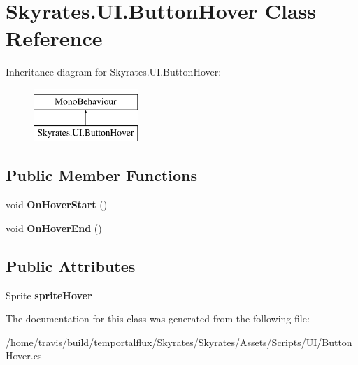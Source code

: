 \hypertarget{class_skyrates_1_1_u_i_1_1_button_hover}{\section{Skyrates.\-U\-I.\-Button\-Hover Class Reference}
\label{class_skyrates_1_1_u_i_1_1_button_hover}
}
Inheritance diagram for Skyrates.\-U\-I.\-Button\-Hover\-:\begin{figure}[H]
\begin{center}
\leavevmode
\includegraphics[height=2.000000cm]{class_skyrates_1_1_u_i_1_1_button_hover}
\end{center}
\end{figure}
\subsection*{Public Member Functions}
\begin{DoxyCompactItemize}
\item 
\hypertarget{class_skyrates_1_1_u_i_1_1_button_hover_a76f52270faea1501da69c8a27d014e42}{void {\bfseries On\-Hover\-Start} ()}\label{class_skyrates_1_1_u_i_1_1_button_hover_a76f52270faea1501da69c8a27d014e42}

\item 
\hypertarget{class_skyrates_1_1_u_i_1_1_button_hover_a91e4d71e8fb334dc2f0da0b592dd03c3}{void {\bfseries On\-Hover\-End} ()}\label{class_skyrates_1_1_u_i_1_1_button_hover_a91e4d71e8fb334dc2f0da0b592dd03c3}

\end{DoxyCompactItemize}
\subsection*{Public Attributes}
\begin{DoxyCompactItemize}
\item 
\hypertarget{class_skyrates_1_1_u_i_1_1_button_hover_a50b8d31e091e5473940b9829734a249c}{Sprite {\bfseries sprite\-Hover}}\label{class_skyrates_1_1_u_i_1_1_button_hover_a50b8d31e091e5473940b9829734a249c}

\end{DoxyCompactItemize}


The documentation for this class was generated from the following file\-:\begin{DoxyCompactItemize}
\item 
/home/travis/build/temportalflux/\-Skyrates/\-Skyrates/\-Assets/\-Scripts/\-U\-I/Button\-Hover.\-cs\end{DoxyCompactItemize}
